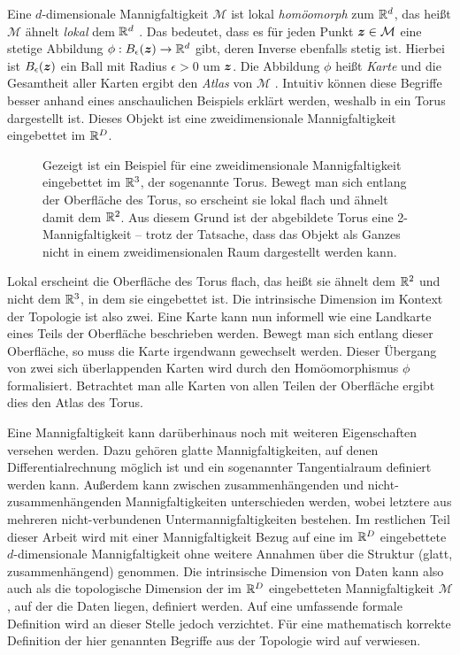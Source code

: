 Eine $d$-dimensionale Mannigfaltigkeit $\mathcal{M}$ ist lokal \textit{homöomorph} zum $\mathbb{R}^d$,
das heißt $\mathcal{M}$ ähnelt \textit{lokal} dem $\mathbb{R}^d$ \parencite[3]{Lee.2011}. Das bedeutet, dass es für jeden Punkt $\bm{z} \in \mathcal{M}$ eine stetige
Abbildung $\phi: B_\epsilon(\bm{z}) \rightarrow \mathbb{R}^d$ gibt, deren Inverse ebenfalls stetig
ist. Hierbei ist $B_\epsilon(\bm{z})$ ein Ball mit Radius $\epsilon > 0$ um $\bm{z}$. Die
Abbildung $\phi$ heißt \textit{Karte} und die Gesamtheit aller Karten ergibt den \textit{Atlas} von
$\mathcal{M}$ \parencite[4]{Cayton.2005}. Intuitiv können diese Begriffe besser anhand eines anschaulichen Beispiels
erklärt werden, weshalb in  ein Torus dargestellt ist. Dieses Objekt ist eine
zweidimensionale Mannigfaltigkeit eingebettet im $\mathbb{R}^D$.
\begin{figure}[ht]
	\centering
	
	\caption[Ein Beispiel für eine zweidimensionale Mannigfaltigkeit: ein Torus]{Gezeigt ist ein Beispiel für eine zweidimensionale Mannigfaltigkeit eingebettet im $\mathbb{R}^3$, der sogenannte Torus. Bewegt man sich entlang der Oberfläche des Torus, so erscheint sie lokal flach und ähnelt damit dem $\mathbb{R}^2$. Aus diesem Grund ist der abgebildete Torus eine 2-Mannigfaltigkeit -- trotz der Tatsache, dass das Objekt als Ganzes nicht in einem zweidimensionalen Raum dargestellt werden kann.}
	\label{fig:Torus}
\end{figure}
Lokal erscheint die Oberfläche des Torus flach, das heißt sie ähnelt dem $\mathbb{R}^2$ und nicht dem $\mathbb{R}^3$, in dem sie eingebettet ist. Die intrinsische Dimension im Kontext der Topologie ist also zwei. Eine Karte kann nun informell wie eine Landkarte eines Teils der Oberfläche beschrieben werden. Bewegt man sich entlang
dieser Oberfläche, so muss die Karte irgendwann gewechselt werden. Dieser Übergang von zwei sich
überlappenden Karten wird durch den Homöomorphismus $\phi$ formalisiert. Betrachtet man alle Karten
von allen Teilen der Oberfläche ergibt dies den Atlas des Torus.

Eine Mannigfaltigkeit kann darüberhinaus noch mit weiteren Eigenschaften versehen werden. Dazu
gehören glatte Mannigfaltigkeiten, auf denen Differentialrechnung möglich ist und ein sogenannter
Tangentialraum definiert werden kann. Außerdem kann zwischen zusammenhängenden und
nicht-zusammenhängenden Mannigfaltigkeiten unterschieden werden, wobei letztere aus mehreren
nicht-verbundenen Untermannigfaltigkeiten bestehen. Im restlichen Teil dieser Arbeit wird mit einer
Mannigfaltigkeit Bezug auf eine im $\mathbb{R}^D$ eingebettete $d$-dimensionale Mannigfaltigkeit ohne
weitere Annahmen über die Struktur (glatt, zusammenhängend) genommen. Die intrinsische Dimension
von Daten kann also auch als die topologische Dimension der im $\mathbb{R}^D$ eingebetteten
Mannigfaltigkeit $\mathcal{M}$, auf der die Daten liegen, definiert werden. Auf eine umfassende
formale Definition wird an dieser Stelle jedoch verzichtet. Für eine mathematisch korrekte
Definition der hier genannten Begriffe aus der Topologie wird auf \textcites{Lee.2011}{Lee.2012}
verwiesen.

